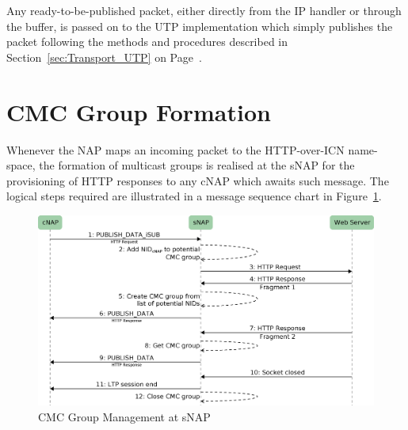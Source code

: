 \documentclass[a4paper,11pt,titlepage]{report}
\begin{document}
Any ready-to-be-published packet, either directly from the IP handler or through the buffer, is passed on to the \ac{UTP} implementation which simply publishes the packet following the methods and procedures described in Section~\ref{sec:Transport_UTP} on Page~\pageref{sec:Transport_UTP}.

\section{\acl{CMC} Group Formation}
Whenever the NAP maps an incoming packet to the HTTP-over-ICN name-space, the formation of multicast groups is realised at the \ac{sNAP} for the provisioning of HTTP responses to any \ac{cNAP} which awaits such message. The logical steps required are illustrated in a message sequence chart in Figure~\ref{fig:CmcGroupManagement}.

\begin{figure}[ht]
  \begin{center}
    \includegraphics[width=\textwidth]{eps/cmcGroupManagement.eps}
    \caption{\acl{CMC} Group Management at \acl{sNAP}}
    \label{fig:CmcGroupManagement}
  \end{center}
\end{figure}
\end{document}
